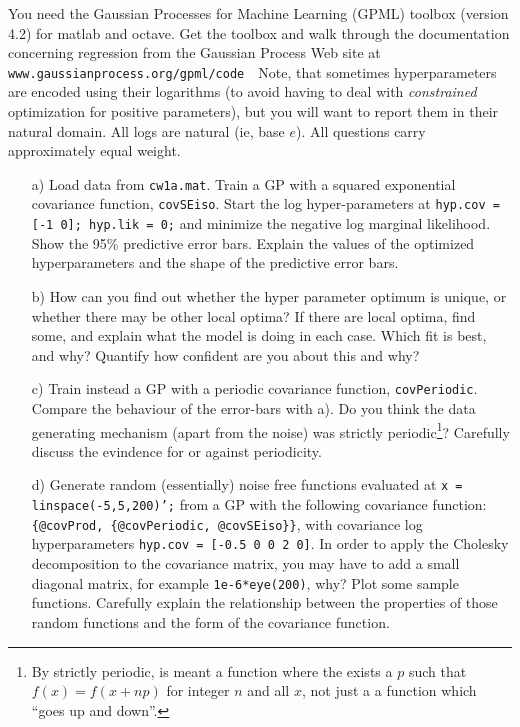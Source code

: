 \documentclass[12pt]{article}
\begin{document}
You need the Gaussian Processes for Machine Learning (GPML) toolbox
(version 4.2) for matlab and octave. Get the toolbox and walk through
the documentation concerning regression from the Gaussian Process Web
site at \texttt{www.gaussianprocess.org/gpml/code}\ \ Note, that
sometimes hyperparameters are encoded using their logarithms (to avoid
having to deal with \emph{constrained} optimization for positive
parameters), but you will want to report them in their natural
domain. All logs are natural (ie, base $e$). All questions carry
approximately equal weight.
%
\begin{enumerate}

\item[a)] Load data from \texttt{cw1a.mat}. Train a GP with a
  squared exponential covariance function, \texttt{covSEiso}. Start
  the log hyper-parameters at \texttt{hyp.cov = [-1 0]; hyp.lik = 0;} and
  minimize the negative log marginal likelihood. Show the 95\%
  predictive error bars. Explain the values of the optimized
  hyperparameters and the shape of the predictive error bars.

\item[b)] How can you find out whether the hyper parameter optimum is
  unique, or whether there may be other local optima? If there are
  local optima, find some, and explain what the model is doing in each
  case. Which fit is best, and why? Quantify how confident are you about this and why?

\item[c)] Train instead a GP with a periodic covariance
  function, \texttt{covPeriodic}. Compare the behaviour of the error-bars with a). Do you
  think the data generating mechanism (apart from the noise) was
  strictly periodic\footnote{By strictly periodic, is meant a
    function where the exists a $p$ such that $f(x)=f(x+np)$ for
    integer $n$ and all
    $x$, not just a a function which ``goes up and down''.}? Carefully
  discuss the evindence for or against periodicity.  
  
\item[d)] Generate random (essentially) noise free functions evaluated
  at \texttt{x = linspace(-5,5,200)';} from a GP with the following
  covariance function: \texttt{\{@covProd, \{@covPeriodic,
    @covSEiso\}\}}, with covariance log hyperparameters
  \texttt{hyp.cov = [-0.5 0 0 2 0]}. In order to apply the Cholesky
  decomposition to the covariance matrix, you may have to add a small
  diagonal matrix, for example \texttt{1e-6*eye(200)}, why?  Plot some
  sample functions. Carefully explain the relationship between the
  properties of those random functions and the form of the covariance
  function.


\end{enumerate}
\end{document}

